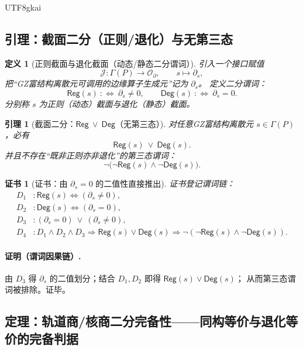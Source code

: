 \documentclass[12pt]{article}
\newtheorem{definition}{定义}[section]
\newtheorem{lemma}{引理}[section]
\newtheorem{Certificate}{证书}[section]
\newcommand{\GZMon}{\texorpdfstring{GZ富结构离散元}{GZ富结构离散元}}
\begin{document}
\begin{CJK*}{UTF8}{gkai}
\subsection{引理：截面二分（正则/退化）与无第三态}
\label{subsec:tex29-meta-dichotomy}

\begin{definition}[正则截面与退化截面（动态/静态二分谓词）]
\label{def:tex29-meta-regular-degenerate}
引入一个接口赋值
\[
  \mathcal{J}:\Gamma(P)\to \mathcal{O}_{\partial},\qquad s\mapsto \partial_s,
\]
把“\GZMon{}可调用的边缘算子生成元”记为 $\partial_s$。
定义二分谓词：
\[
  \mathsf{Reg}(s)\ :\Longleftrightarrow\ \partial_s\neq 0,
  \qquad
  \mathsf{Deg}(s)\ :\Longleftrightarrow\ \partial_s=0.
\]
分别称 $s$ 为正则（动态）截面与退化（静态）截面。
\end{definition}

\begin{lemma}[截面二分：$\mathsf{Reg}\ \vee\ \mathsf{Deg}$（无第三态）]
\label{lem:tex29-meta-dichotomy}
对任意\GZMon{} $s\in\Gamma(P)$，必有
\[
  \mathsf{Reg}(s)\ \vee\ \mathsf{Deg}(s).
\]
并且不存在“既非正则亦非退化”的第三态谓词：
\[
  \neg\bigl(\neg\mathsf{Reg}(s)\wedge \neg\mathsf{Deg}(s)\bigr).
\]
\end{lemma}

\begin{Certificate}[证书：由 $\partial_s=0$ 的二值性直接推出]
\label{cert:tex29-meta-dichotomy}
证书登记谓词链：
\[
\begin{aligned}
  D_1 &: \mathsf{Reg}(s)\Longleftrightarrow (\partial_s\neq 0),\\
  D_2 &: \mathsf{Deg}(s)\Longleftrightarrow (\partial_s=0),\\
  D_3 &: (\partial_s=0)\ \vee\ (\partial_s\neq 0),\\
  D_4 &: D_1\wedge D_2\wedge D_3\Rightarrow \mathsf{Reg}(s)\vee\mathsf{Deg}(s)\Rightarrow \neg(\neg\mathsf{Reg}(s)
    \wedge\neg\mathsf{Deg}(s)).
\end{aligned}
\]
\end{Certificate}

\paragraph{证明（谓词因果链）.}
由 $D_3$ 得 $\partial_s$ 的二值划分；结合 $D_1,D_2$ 即得 $\mathsf{Reg}(s)\vee\mathsf{Deg}(s)$；
从而第三态谓词被排除。证毕。

\subsection{定理：轨道商/核商二分完备性——同构等价与退化等价的完备判据}
\label{subsec:tex29-meta-two-equivalences}


\end{CJK*}
\end{document}

